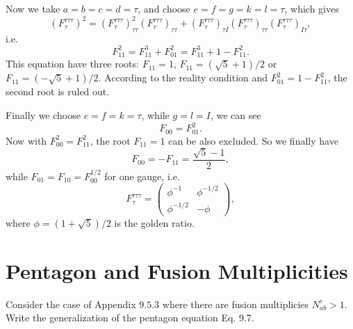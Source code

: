 \documentclass{book}
\begin{document}
Now we take $a=b=c=d=\tau $, and choose $e=f=g=k=l=\tau $, which gives
\begin{equation*}
(F_{\tau }^{\tau \tau \tau } )^{2} =(F_{\tau }^{\tau \tau \tau } )_{\tau \tau }^{2} (F_{\tau }^{\tau \tau \tau } )_{\tau \tau } +(F_{\tau }^{\tau \tau \tau } )_{\tau I} (F_{\tau }^{\tau \tau \tau } )_{\tau \tau } (F_{\tau }^{\tau \tau \tau } )_{I\tau } ,
\end{equation*}
i.e.
\begin{equation*}
F_{11}^{2} =F_{11}^{3} +F_{01}^{2} =F_{11}^{3} +1-F_{11}^{2} .
\end{equation*}
This equation have three roots: $F_{11} =1$, $F_{11} =(\sqrt{5} +1)/2$ or $F_{11} =(-\sqrt{5} +1)/2$. According to the reality condition and $F_{01}^{2} =1-F_{11}^{2}$, the second root is ruled out. 

Finally we choose $e=f=k=\tau $, while $g=l=I$, we can see
\begin{equation*}
F_{00} =F_{01}^{2} .
\end{equation*}
Now with $F_{00}^{2} =F_{11}^{2}$, the root $F_{11} =1$ can be also excluded. So we finally have
\begin{equation*}
F_{00} =-F_{11} =\frac{\sqrt{5} -1}{2} ,
\end{equation*}
while $F_{01} =F_{10} =F_{00}^{1/2}$ for one gauge, i.e.
\begin{equation*}
F_{\tau }^{\tau \tau \tau } =\begin{pmatrix}
\phi ^{-1} & \phi ^{-1/2}\\
\phi ^{-1/2} & -\phi 
\end{pmatrix} ,
\end{equation*}
where $\phi =(1+\sqrt{5} )/2$ is the golden ratio. 

\section{Pentagon and Fusion Multiplicities}
Consider the case of Appendix $9.5.3$ where there are fusion multiplicies $N_{ab}^{c}  >1$. Write the generalization of the pentagon equation Eq. 9.7.
\end{document}
